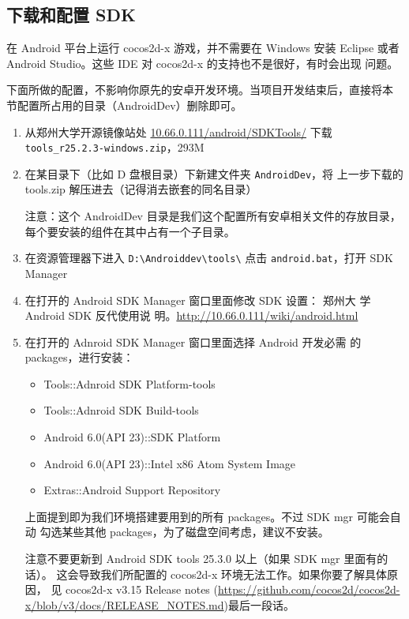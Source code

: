 \documentclass[a4paper, 10pt]{article}
\begin{document}
\subsection{下载和配置 SDK}

在 Android 平台上运行 cocos2d-x 游戏，并不需要在 Windows 安装 Eclipse
或者 Android Studio。这些 IDE 对 cocos2d-x 的支持也不是很好，有时会出现
问题。

下面所做的配置，不影响你原先的安卓开发环境。当项目开发结束后，直接将本
节配置所占用的目录（AndroidDev）删除即可。

\begin{enumerate}
\item 从郑州大学开源镜像站处 \url{10.66.0.111/android/SDKTools/} 下载
  \texttt{tools\_r25.2.3-windows.zip}，293M
  
\item 在某目录下（比如 D 盘根目录）下新建文件夹 \texttt{AndroidDev}，将
  上一步下载的 tools.zip 解压进去（记得消去嵌套的同名目录）

  注意：这个 AndroidDev 目录是我们这个配置所有安卓相关文件的存放目录，
  每个要安装的组件在其中占有一个子目录。

\item 在资源管理器下进入
  \texttt{D:\textbackslash{}Androiddev\textbackslash{}tools\textbackslash{}}
  点击 \texttt{android.bat}，打开 SDK Manager

\item 在打开的 Android SDK Manager 窗口里面修改 SDK 设置： 郑州大
  学 Android SDK 反代使用说
  明。\url{http://10.66.0.111/wiki/android.html}

\item 在打开的 Adnroid SDK Manager 窗口里面选择 Android 开发必需
  的 packages，进行安装：

  \begin{itemize}
  \item Tools::Adnroid SDK Platform-tools
  \item Tools::Adnroid SDK Build-tools
  \item Android 6.0(API 23)::SDK Platform
  \item Android 6.0(API 23)::Intel x86 Atom System Image
  \item Extras::Android Support Repository
  \end{itemize}

  上面提到即为我们环境搭建要用到的所有 packages。不过 SDK mgr 可能会自动
  勾选某些其他 packages，为了磁盘空间考虑，建议不安装。

  注意不要更新到 Android SDK tools 25.3.0 以上（如果 SDK mgr 里面有的话）。
  这会导致我们所配置的 cocos2d-x 环境无法工作。如果你要了解具体原因，
  见 cocos2d-x v3.15 Release notes
  (\url{https://github.com/cocos2d/cocos2d-x/blob/v3/docs/RELEASE_NOTES.md})最后一段话。

\end{enumerate}
\end{document}
